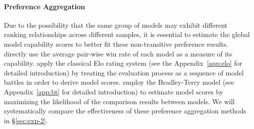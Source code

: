 \paragraph{Preference Aggregation}
\label{sec:2-pa}
Due to the possibility that the same group of models may exhibit different ranking relationships across different samples, it is essential to estimate the global model capability scores to better fit these non-transitive preference results.
\citet{alpacaeval,judging} directly use the average pair-wise win rate of each model as a measure of its capability. 
\citet{elo2,elo1} apply the classical Elo rating system \citep{elo} (see the Appendix~\ref{app:elo} for detailed introduction) by treating the evaluation process as a sequence of model battles in order to derive model scores. 
\citet{BTapp,arena} employ the Bradley-Terry model \citep{BT} (see Appendix~\ref{app:bt} for detailed introduction) to estimate model scores by maximizing the likelihood of the comparison results between models. We will systematically compare the effectiveness of these preference aggregation methods in \S\ref{sec:exp-2}.
